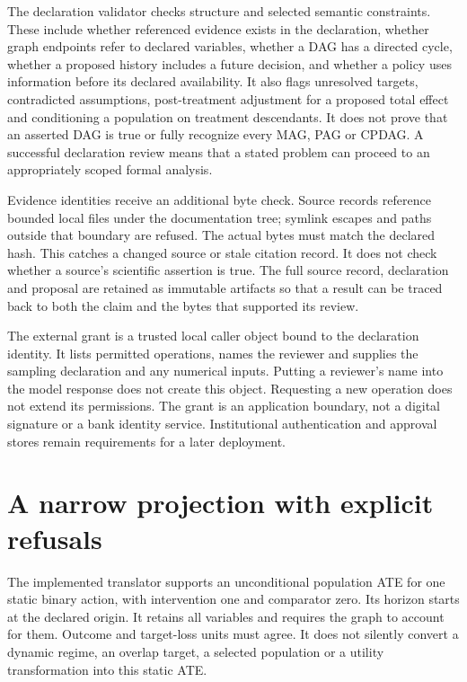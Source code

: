 The declaration validator checks structure and selected semantic constraints.
These include whether referenced evidence exists in the declaration, whether
graph endpoints refer to declared variables, whether a DAG has a directed cycle,
whether a proposed history includes a future decision, and whether a policy
uses information before its declared availability. It also flags unresolved
targets, contradicted assumptions, post-treatment adjustment for a proposed
total effect and conditioning a population on treatment descendants. It does
not prove that an asserted DAG is true or fully recognize every MAG, PAG or
CPDAG. A successful declaration review means that a stated problem can proceed
to an appropriately scoped formal analysis.

Evidence identities receive an additional byte check. Source records reference
bounded local files under the documentation tree; symlink escapes and paths
outside that boundary are refused. The actual bytes must match the declared
hash. This catches a changed source or stale citation record. It does not check
whether a source's scientific assertion is true. The full source record,
declaration and proposal are retained as immutable artifacts so that a result
can be traced back to both the claim and the bytes that supported its review.

The external grant is a trusted local caller object bound to the declaration
identity. It lists permitted operations, names the reviewer and supplies the
sampling declaration and any numerical inputs. Putting a reviewer's name into
the model response does not create this object. Requesting a new operation does
not extend its permissions. The grant is an application boundary, not a digital
signature or a bank identity service. Institutional authentication and approval
stores remain requirements for a later deployment.

\section{A narrow projection with explicit refusals}

The implemented translator supports an unconditional population ATE for one
static binary action, with intervention one and comparator zero. Its horizon
starts at the declared origin. It retains all variables and requires the graph
to account for them. Outcome and target-loss units must agree. It does not
silently convert a dynamic regime, an overlap target, a selected population or
a utility transformation into this static ATE.


